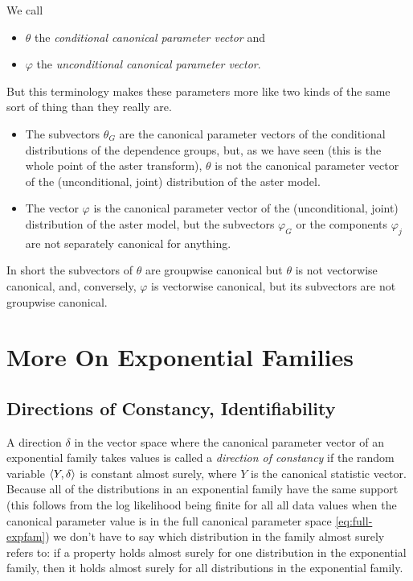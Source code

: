 We call
\begin{itemize}
\item $\theta$ the \emph{conditional canonical parameter vector} and
\item $\varphi$ the \emph{unconditional canonical parameter vector}.
\end{itemize}
But this terminology makes these parameters more like two kinds of the
same sort of thing than they really are.
\begin{itemize}
\item The subvectors $\theta_G$ are the canonical parameter vectors of
    the conditional distributions of the dependence groups, but, as
    we have seen (this is the whole point of the aster transform),
    $\theta$ is not the canonical parameter vector of the (unconditional,
    joint) distribution of the aster model.
\item The vector $\varphi$ is the canonical parameter vector of the
    (unconditional, joint)
    distribution of the aster model, but the subvectors $\varphi_G$ or the
    components $\varphi_j$ are not separately canonical for anything.
\end{itemize}
In short the subvectors of $\theta$ are groupwise canonical but
$\theta$ is not vectorwise canonical, and, conversely,
$\varphi$ is vectorwise canonical, but its subvectors are not groupwise
canonical.

\section{More On Exponential Families}

\subsection{Directions of Constancy, Identifiability}
\label{sec:direction-of-constancy}

A direction $\delta$ in the vector space where the canonical parameter vector
of an exponential family takes values is called a \emph{direction of constancy}
if the random variable $\langle Y, \delta \rangle$ is constant almost surely,
where $Y$ is the canonical statistic vector.
Because all of the distributions in an exponential family have
the same support (this follows from the log likelihood being finite for
all all data values when the canonical parameter value is in the full
canonical parameter space \eqref{eq:full-expfam}) we don't have to say
which distribution in the family almost surely refers to: if a property
holds almost surely for one distribution in the exponential family,
then it holds almost surely for all distributions in the exponential family.

